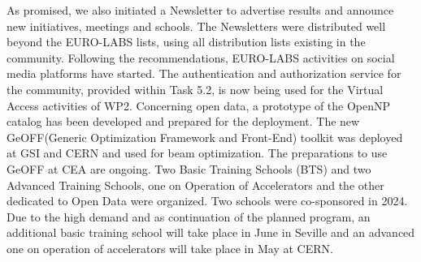 As promised, we also initiated a Newsletter to advertise results and announce new initiatives, meetings and schools. The Newsletters were distributed well beyond the EURO-LABS lists, using all distribution lists existing in the community. Following the recommendations, EURO-LABS activities on social media platforms have started.
The authentication and authorization service for the community, provided within Task 5.2, is now being used for the Virtual Access activities of WP2. Concerning open data, a prototype of the OpenNP catalog 
has been developed and prepared for the deployment. The new GeOFF(Generic Optimization Framework
and Front-End) toolkit was deployed at GSI and CERN and used for beam optimization. The preparations to use GeOFF at CEA are ongoing.
Two Basic Training Schools (BTS) and two Advanced Training Schools, one on Operation
of Accelerators and the other dedicated to Open Data were organized.
Two schools were co-sponsored in 2024. Due to the high demand and as continuation of the planned program, an additional basic training school will take place in June in Seville and an advanced one on operation of accelerators will take place in May at CERN.

